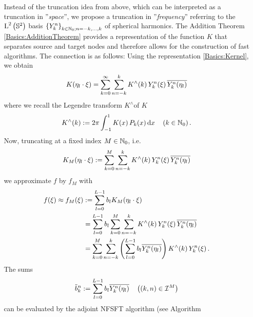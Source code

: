 Instead of the truncation idea from above, which can be interpreted as a truncation in ''\emph{space}'', we propose a truncation in ''\emph{frequency}'' referring to the
$\text{\rm{L}}^{2}\left(\mathbb{S}^2\right)$ basis $\left\{Y_{k}^n\right\rbrace_{k\in\mathbb{N}_{0}; n = -k,\ldots,k}$ of spherical 
harmonics. The Addition Theorem \ref{Basics:AdditionTheorem} provides a 
representation of the function $K$ that separates source and target nodes and 
therefore allows for the construction of fast algorithms. The connection is as 
follows: Using the representation \eqref{Basics:Kernel}, we obtain
\begin{equation}
  \label{Applications:KSeries}
  K{\hspace{-0.4ex}}\left(\mathbf{\eta}_{l} \cdot \mathbf{\xi}\right) = \sum_{k=0}^{\infty} \sum_{n=-k}^k 
  K^{\wedge}{\hspace{-0.4ex}}\left(k\right)   Y_{k}^n{\hspace{-0.4ex}}\left(\mathbf{\xi}\right) \overline{Y_{k}^n{\hspace{-0.4ex}}\left(\mathbf{\eta}_{l}\right)}
\end{equation}
where we recall the Legendre transform $K^{\wedge}$of $K$
\[
  K^{\wedge}{\hspace{-0.4ex}}\left(k\right) := 2 \pi \int_{-1}^{1} K{\hspace{-0.4ex}}\left(x\right) P_{k}{\hspace{-0.4ex}}\left(x\right) \text{\rm{d}} x 
  \quad \left(k \in \mathbb{N}_{0}\right).
\]
Now, truncating at a fixed index $M \in \mathbb{N}_{0}$, i.e.
\begin{equation}
  \label{Applications:TruncatedSeries}
  K_{M}{\hspace{-0.4ex}}\left(\mathbf{\eta}_{l} \cdot \mathbf{\xi}\right) := 
  \sum_{k=0}^{M} \sum_{n=-k}^k K^{\wedge}{\hspace{-0.4ex}}\left(k\right) Y_{k}^n{\hspace{-0.4ex}}\left(\mathbf{\xi}\right) \overline{Y_{k}^n{\hspace{-0.4ex}}\left(\mathbf{\eta}_{l}\right)}
\end{equation}
we approximate $f$ by $f_{M}$ with
\begin{equation}
  \nonumber
  \begin{split}
    f{\hspace{-0.4ex}}\left(\xi\right) \approx f_{M}{\hspace{-0.4ex}}\left(\xi\right) & := \sum_{l = 0}^{L-1} b_{l} K_{M}{\hspace{-0.4ex}}\left(\mathbf{\eta}_{l} \cdot \mathbf{\xi}\right) \\
                 &       = \sum_{l = 0}^{L-1} b_{l} \sum_{k=0}^{M} \sum_{n=-k}^k K^{\wedge}{\hspace{-0.4ex}}\left(k\right)
                           Y_{k}^n{\hspace{-0.4ex}}\left(\mathbf{\xi}\right) \overline{Y_{k}^n{\hspace{-0.4ex}}\left(\mathbf{\eta}_{l}\right)} \\
                 &       = \sum_{k=0}^{M} \sum_{n=-k}^k \left(\sum_{l = 0}^{L-1} b_{l}
                           \overline{Y_{k}^n{\hspace{-0.4ex}}\left(\mathbf{\eta}_{l}\right)}\right) K^{\wedge}{\hspace{-0.4ex}}\left(k\right) Y_{k}^n{\hspace{-0.4ex}}\left(\mathbf{\xi}\right).
  \end{split}                           
\end{equation}
The sums
\begin{equation}
\label{Applications:AdjointNDSFT}
  \tilde{b}_{k}^n := \sum_{l = 0}^{L-1} b_{l} \overline{Y_{k}^n{\hspace{-0.4ex}}\left(\mathbf{\eta}_{l}\right)} \quad \left((k,n) \in \mathcal{I}^M\right)
\end{equation}
can be evaluated by the adjoint NFSFT algorithm (see Algorithm 
